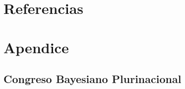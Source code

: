 \documentclass[a4paper,11pt]{book}
\theoremstyle{definition}
\begin{document}
\chapter{Referencias}




\chapter{Apendice} \label{app:technical}


\section{Congreso Bayesiano Plurinacional}

\pagestyle{empty}

\begin{figure}[H]
  \centering
    \begin{subfigure}[b]{0.95\textwidth} \centering
    \end{subfigure}
\end{figure}
\end{document}
